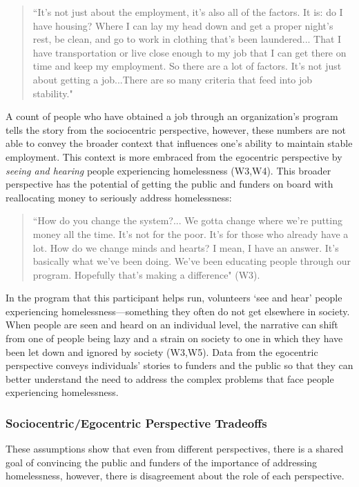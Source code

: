 \begin{quote}\singlespacing ``It's not just about the employment, it's also all of the factors. It is: do I have housing? Where I can lay my head down and get a proper night's rest, be clean, and go to work in clothing that's been laundered... That I have transportation or live close enough to my job that I can get there on time and keep my employment. So there are a lot of factors. It's not just about getting a job...There are so many criteria that feed into job stability." \end{quote}

A count of people who have obtained a job through an organization's program tells the story from the sociocentric perspective, however, these numbers are not able to convey the broader context that influences one's ability to maintain stable employment. This context is more embraced from the egocentric perspective by \textit{seeing and hearing} people experiencing homelessness (W3,W4). This broader perspective has the potential of getting the public and funders on board with reallocating money to seriously address homelessness:

\begin{quote}\singlespacing ``How do you change the system?... We gotta change where we're putting money all the time. It's not for the poor. It's for those who already have a lot. How do we change minds and hearts? I mean, I have an answer. It's basically what we've been doing. We've been educating people through our program. Hopefully that's making a difference" (W3).\end{quote}

In the program that this participant helps run, volunteers `see and hear' people experiencing homelessness---something they often do not get elsewhere in society. When people are seen and heard on an individual level, the narrative can shift from one of people being lazy and a strain on society to one in which they have been let down and ignored by society (W3,W5). Data from the egocentric perspective conveys individuals' stories to funders and the public so that they can better understand the need to address the complex problems that face people experiencing homelessness.

\subsubsection{Sociocentric/Egocentric Perspective Tradeoffs}

These assumptions show that even from different perspectives, there is a shared goal of convincing the public and funders of the importance of addressing homelessness, however, there is disagreement about the role of each perspective. 

